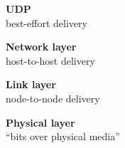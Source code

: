 \begin{frame}\begin{center}\large
\textbf{UDP}\\
\large best-effort delivery
\end{center}\end{frame}

\begin{frame}\begin{center}\large
\textbf{Network layer}\\ 
\large host-to-host delivery 
\end{center}\end{frame}

\begin{frame}\begin{center}\large\textbf{Link layer}\\ 
\large node-to-node delivery 
\end{center}\end{frame}

\begin{frame}\begin{center}\large
\textbf{Physical layer}\\\large ``bits over physical media'' 
\end{center}\end{frame}
